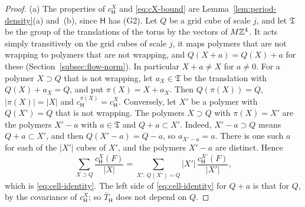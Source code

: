 \begin{proof}
(a) The properties of $c^X_{\mathsf H}$ and \eqref{eq:cX-bound} are Lemma~\ref{lem:period-density}(a) and~(b), since $\mathsf H$ has (G2). Let $Q$ be a grid cube of scale $j$, and let $\mathfrak T$ be the group of the translations of the torus by the vectors of $M\mathbb Z^4$. It acts simply transitively on the grid cubes of scale $j$, it maps polymers that are not wrapping to polymers that are not wrapping, and $Q(X+a)=Q(X)+a$ for these (Section~\ref{subsec:flow-norm}). In particular $X+a\ne X$ for $a\ne0$. For a polymer $X\supset Q$ that is not wrapping, let $a_X\in\mathfrak T$ be the translation with $Q(X)+a_X=Q$, and put $\pi(X)=X+a_X$. Then $Q(\pi(X))=Q$, $|\pi(X)|=|X|$ and $c^{\pi(X)}_{\mathsf H}=c^X_{\mathsf H}$. Conversely, let $X'$ be a polymer with $Q(X')=Q$ that is not wrapping. The polymers $X\supset Q$ with $\pi(X)=X'$ are the polymers $X'-a$ with $a\in\mathfrak T$ and $Q+a\subset X'$. Indeed, $X'-a\supset Q$ means $Q+a\subset X'$, and then $Q(X'-a)=Q-a$, so $a_{X'-a}=a$. There is one such $a$ for each of the $|X'|$ cubes of $X'$, and the polymers $X'-a$ are distinct. Hence
\[
\sum_{X\supset Q}\frac{c^X_{\mathsf H}(F)}{|X|}=\sum_{X':\,Q(X')=Q}|X'|\,\frac{c^{X'}_{\mathsf H}(F)}{|X'|},
\]
which is \eqref{eq:cell-identity}. The left side of \eqref{eq:cell-identity} for $Q+a$ is that for $Q$, by the covariance of $c^X_{\mathsf H}$; so $\bar T_{\mathsf H}$ does not depend on $Q$.


\end{proof}
